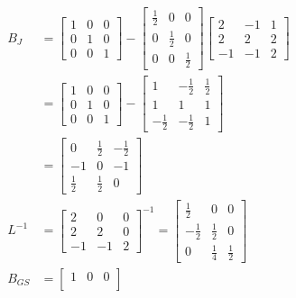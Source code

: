 \documentclass[11pt, letterpaper]{article}
\begin{document}
\begin{align*}
    B_J&=
    \begin{bmatrix}
        1 & 0 & 0 \\
        0 & 1 & 0\\
        0 & 0 & 1
    \end{bmatrix}
    -
    \begin{bmatrix}
        \frac{1}{2} & 0 & 0\\
        0 & \frac{1}{2} & 0\\
        0 & 0 & \frac{1}{2}
    \end{bmatrix}
    \begin{bmatrix}
        2 & -1 & 1\\
        2 & 2 & 2\\
        -1 & -1 & 2
    \end{bmatrix}\\
    &=
    \begin{bmatrix}
        1 & 0 & 0 \\
        0 & 1 & 0\\
        0 & 0 & 1
    \end{bmatrix}
    -
    \begin{bmatrix}
        1 & -\frac{1}{2} & \frac{1}{2}\\
        1 & 1 & 1\\
        -\frac{1}{2} & -\frac{1}{2} & 1
    \end{bmatrix}\\
    &=
    \begin{bmatrix}
        0 & \frac{1}{2} & -\frac{1}{2}\\
        -1 & 0 & -1\\
        \frac{1}{2} & \frac{1}{2} & 0
    \end{bmatrix}\\
    L^{-1}&=
    \begin{bmatrix}
        2 & 0 & 0\\
        2 & 2 & 0\\
        -1 & -1 & 2
    \end{bmatrix}^{-1}
    =
    \begin{bmatrix}
        \frac{1}{2} & 0 & 0\\
        -\frac{1}{2} & \frac{1}{2} & 0\\
        0 & \frac{1}{4} & \frac{1}{2} 
    \end{bmatrix}\\
    B_{GS}&=
    \begin{bmatrix}
        1 & 0 & 0 \\

\end{bmatrix}
\end{align*}
\end{document}
